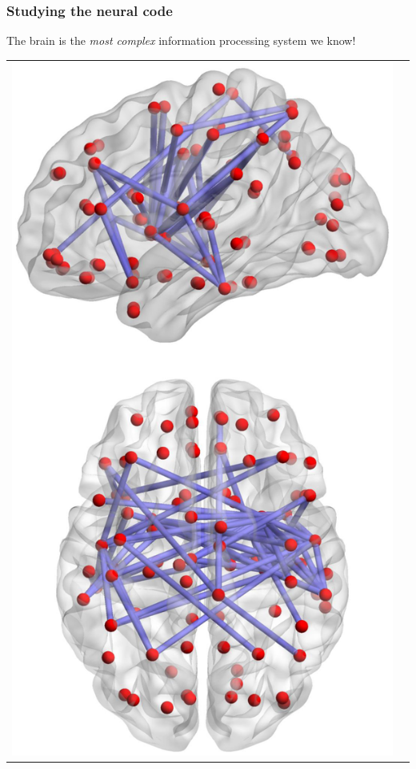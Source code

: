 \documentclass{beamer}
\begin{document}
\begin{frame}
\frametitle{Studying the neural code}
The brain is the \emph{most complex} information processing system we know!
\vspace{0.3in}
\begin{center}
\begin{tabular}{cc}
\includegraphics[scale = 0.3, clip =true, trim=0 0 0 2.5in]{Brain_network.png} &

\end{tabular}
\end{center}
\end{frame}
\end{document}
